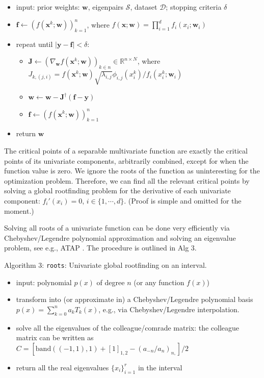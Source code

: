 \documentclass{article}
\begin{document}
\begin{itemize}

\item
  input: prior weights: $\mathbf{w}$, eigenpairs $\mathcal{S}$,
  dataset $\mathcal{D}$; stopping criteria $\delta$
\item
  $\mathbf{f} \gets (f(\mathbf{x}^k; \mathbf{w}))_{k=1}^n$, where
  $f(\mathbf{x}; \mathbf{w}) = \prod_{i=1}^d f_i(x_i; \mathbf{w}_i)$
\item
  repeat until $|\mathbf{y} - \mathbf{f}| < \delta$:

  \begin{itemize}
  
  \item
    $\mathbf{J} \gets (\nabla_{\mathbf{w}} f(\mathbf{x}^k; \mathbf{w}))_{k \in n}  \in \mathbb{R}^{n \times N}$,
    where\\
    $J_{k,(j,i)} = {f(\mathbf{x}^k; \mathbf{w})}  \sqrt{\lambda_{i,j}} \phi_{i,j}(x_i^k) / {f_i(x_i^k; \mathbf{w}_i)}$
  \item
    $\mathbf{w} \gets \mathbf{w} - \mathbf{J}^\dagger (\mathbf{f} - \mathbf{y})$
  \item
    $\mathbf{f} \gets (f(\mathbf{x}^k; \mathbf{w}))_{k=1}^n$
  \end{itemize}
\item
  return $\mathbf{w}$
\end{itemize}

The critical points of a separable multivariate function are exactly the
critical points of its univariate components, arbitrarily combined,
except for when the function value is zero. We ignore the roots of the
function as uninteresting for the optimization problem. Therefore, we
can find all the relevant critical points by solving a global
rootfinding problem for the derivative of each univariate component:
$f_i'(x_i) = 0$, $i \in \{1, \cdots, d\}$. (Proof is simple and
omitted for the moment.)

Solving all roots of a univariate function can be done very efficiently
via Chebyshev/Legendre polynomial approximation and solving an
eigenvalue problem, see e.g., ATAP \cite{Trefethen2019}. The procedure
is outlined in Alg 3.

Algorithm 3: \texttt{roots}: Univariate global rootfinding on an
interval.

\begin{itemize}

\item
  input: polynomial $p(x)$ of degree $n$ (or any function $f(x)$)
\item
  transform into (or approximate in) a Chebyshev/Legendre polynomial
  basis $p(x) = \sum_{k=0}^n a_k T_k(x)$, e.g., via Chebyshev/Legendre
  interpolation.
\item
  solve all the eigenvalues of the colleague/comrade matrix: the
  colleague matrix can be written as
  $C = [\mathrm{band}((-1, 1), 1) + [1]_{1,2} - (a_{-n} / a_n)_{n,}] / 2$
\item
  return all the real eigenvalues $\{x_i\}_{i=1}^r$ in the interval
\end{itemize}
\end{document}
